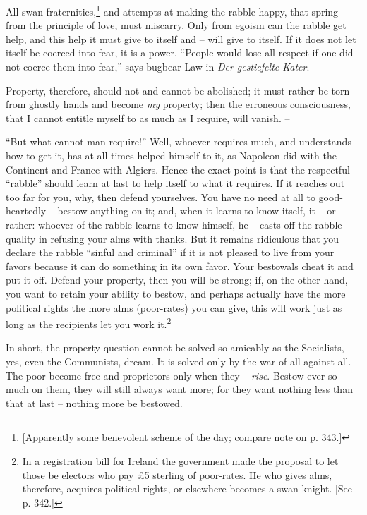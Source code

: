 All swan-fraternities,\footnote{[Apparently some benevolent scheme of the day; 
compare note on p. 343.]} and attempts at making the rabble happy, that spring 
from the principle of love, must miscarry. Only from egoism can the rabble get 
help, and this help it must give to itself and -- will give to itself. If it 
does not let itself be coerced into fear, it is a power. ``People would lose 
all respect if one did not coerce them into fear,'' says bugbear Law in 
\textit{Der gestiefelte Kater}.

Property, therefore, should not and cannot be abolished; it must rather be 
torn from ghostly hands and become \textit{my} property; then the erroneous 
consciousness, that I cannot entitle myself to as much as I require, will 
vanish. --

``But what cannot man require!'' Well, whoever requires much, and 
understands how to get it, has at all times helped himself to it, as Napoleon 
did with the Continent and France with Algiers. Hence the exact point is that 
the respectful ``rabble'' should learn at last to help itself to what it 
requires. If it reaches out too far for you, why, then defend yourselves. You 
have no need at all to good-heartedly -- bestow anything on it; and, when it 
learns to know itself, it -- or rather: whoever of the rabble learns to know 
himself, he -- casts off the rabble-quality in refusing your alms with thanks. 
But it remains ridiculous that you declare the rabble ``sinful and 
criminal'' if it is not pleased to live from your favors because it can do 
something in its own favor. Your bestowals cheat it and put it off. Defend 
your property, then you will be strong; if, on the other hand, you want to 
retain your ability to bestow, and perhaps actually have the more political 
rights the more alms (poor-rates) you can give, this will work just as long as 
the recipients let you work it.\footnote{In a registration bill for Ireland 
the government made the proposal to let those be electors who pay \pounds{}5 
sterling of poor-rates. He who gives alms, therefore, acquires political 
rights, or elsewhere becomes a swan-knight. [See p. 342.]}

In short, the property question cannot be solved so amicably as the 
Socialists, yes, even the Communists, dream. It is solved only by the war of 
all against all. The poor become free and proprietors only when they -- 
\textit{rise}. Bestow ever so much on them, they will still always want more; 
for they want nothing less than that at last -- nothing more be bestowed.

